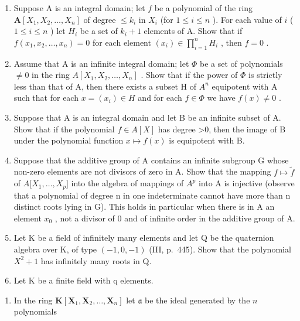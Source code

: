 \BourbakiExerciseGroup

\begin{enumerate}
\def\labelenumi{\arabic{enumi})}
\item
  Suppose A is an integral domain; let \(f\) be a polynomial of the ring \(\mathbf{A}[X_1, X_2, \ldots, X_n]\) of degree \(\leqslant k_i\) in \(X_i\) (for \(1 \leqslant i \leqslant n\) ). For each value of \(i\) ( \(1 \leqslant i \leqslant n\) ) let \(H_i\) be a set of \(k_i + 1\) elements of A. Show that if \(f(x_1, x_2, \ldots, x_n) = 0\) for each element \((x_i) \in \prod_{i=1}^{n} H_i\) , then \(f = 0\) .
\item
  Assume that A is an infinite integral domain; let \(\Phi\) be a set of polynomials \(\neq0\) in the ring \(A[X_{1},X_{2},\ldots,X_{n}]\) . Show that if the power of \(\Phi\) is strictly less than that of A, then there exists a subset H of \(A^{n}\) equipotent with A such that for each \(x=(x_{i})\in H\) and for each \(f\in\Phi\) we have \(f(x)\neq0\) .
\item
  Suppose that A is an integral domain and let B be an infinite subset of A. Show that if the polynomial \(f \in A[X]\) has degree \textgreater0, then the image of B under the polynomial function \(x \mapsto f(x)\) is equipotent with B.
\item
  Suppose that the additive group of A contains an infinite subgroup G whose non-zero elements are not divisors of zero in A. Show that the mapping \(f \mapsto \tilde{f}\) of \(A{[}X_{1}, \ldots, X_{p}{]}\) into the algebra of mappings of \(A^{p}\) into A is injective (observe that a polynomial of degree n in one indeterminate cannot have more than n distinct roots lying in G). This holds in particular when there is in A an element \(x_{0}\) , not a divisor of 0 and of infinite order in the additive group of A.
\item
  Let K be a field of infinitely many elements and let Q be the quaternion algebra over K, of type \((-1,0,-1)\) (III, p.~445). Show that the polynomial \(X^{2}+1\) has infinitely many roots in Q.
\item
  Let K be a finite field with q elements.
\end{enumerate}

\begin{enumerate}
\def\labelenumi{\alph{enumi})}
\tightlist
\item
  In the ring \(\mathbf{K}[\mathbf{X}_1, \mathbf{X}_2, \ldots, \mathbf{X}_n]\) let \(\mathfrak{a}\) be the ideal generated by the \(n\) polynomials
\end{enumerate}

